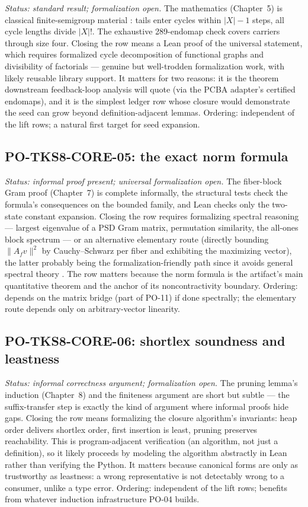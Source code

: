 \emph{Status: standard result; formalization open.} The mathematics
(Chapter~5) is classical finite-semigroup material \cite{pin}: tails
enter cycles within $|X|-1$ steps, all cycle lengths divide $|X|!$.
The exhaustive 289-endomap check covers carriers through size four.
Closing the row means a Lean proof of the universal statement, which
requires formalized cycle decomposition of functional graphs and
divisibility of factorials --- genuine but well-trodden formalization
work, with likely reusable library support. It matters for two
reasons: it is the theorem downstream feedback-loop analysis will
quote (via the PCBA adapter's certified endomaps), and it is the
simplest ledger row whose closure would demonstrate the seed can
grow beyond definition-adjacent lemmas. Ordering: independent of the
lift rows; a natural first target for seed expansion.

\subsection{PO-TKS8-CORE-05: the exact norm formula}

\emph{Status: informal proof present; universal formalization open.}
The fiber-block Gram proof (Chapter~7) is complete informally, the
structural tests check the formula's consequences on the bounded
family, and Lean checks only the two-state constant expansion.
Closing the row requires formalizing spectral reasoning --- largest
eigenvalue of a PSD Gram matrix, permutation similarity, the all-ones
block spectrum --- or an alternative elementary route (directly
bounding $\lVert A_f v\rVert^2$ by Cauchy--Schwarz per fiber and
exhibiting the maximizing vector), the latter probably being the
formalization-friendly path since it avoids general spectral theory
\cite{horn}. The row matters because the norm formula is the
artifact's main quantitative theorem and the anchor of its
noncontractivity boundary. Ordering: depends on the matrix bridge
(part of PO-11) if done spectrally; the elementary route depends only
on arbitrary-vector linearity.

\subsection{PO-TKS8-CORE-06: shortlex soundness and leastness}

\emph{Status: informal correctness argument; formalization open.} The
pruning lemma's induction (Chapter~8) and the finiteness argument are
short but subtle --- the suffix-transfer step is exactly the kind of
argument where informal proofs hide gaps. Closing the row means
formalizing the closure algorithm's invariants: heap order delivers
shortlex order, first insertion is least, pruning preserves
reachability. This is program-adjacent verification (an algorithm,
not just a definition), so it likely proceeds by modeling the
algorithm abstractly in Lean rather than verifying the Python.
It matters because canonical forms are only as trustworthy as
leastness: a wrong representative is not detectably wrong to a
consumer, unlike a type error. Ordering: independent of the lift
rows; benefits from whatever induction infrastructure PO-04 builds.

